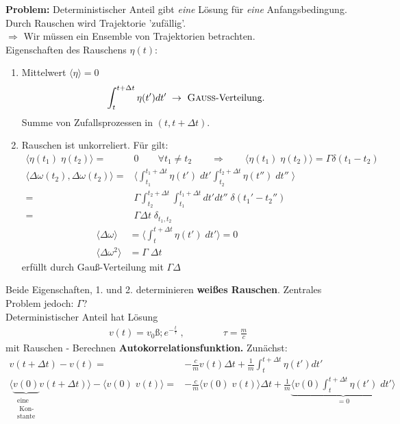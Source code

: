 \documentclass[12pt]{article}
\begin{document}
\textbf{Problem:} Deterministischer Anteil gibt \textit{eine} Lösung für \textit{eine} Anfangsbedingung. Durch Rauschen wird Trajektorie 'zufällig'. \\
$\Rightarrow$ Wir müssen ein Ensemble von Trajektorien betrachten.\\
Eigenschaften des Rauschens $\eta (t)$:
\begin{enumerate}
\item Mittelwert $\langle \eta \rangle = 0 $
\begin{align}
\int_t^{t + \Delta t} \eta (t') dt' \; \to \mbox{ \textsc{Gauss}-Verteilung.}
\end{align}
Summe von Zufallsprozessen in $(t, t+\Delta t)$.
\item Rauschen ist unkorreliert. Für gilt:
\begin{align*}
 \langle \eta(t_1) \; \eta (t_2) \rangle =& 0 \qquad \forall t_1 \neq t_2  \qquad \Rightarrow \qquad
 \langle \eta(t_1) \; \eta (t_2) \rangle = \Gamma \delta (t_1 - t_2)\\
 \langle\Delta \omega(t_2), \Delta \omega(t_2)\rangle
 =& \langle \int_{t_1}^{t_1 + \Delta t} \eta (t')  \; dt'  \int_{t_2}^{t_2 + \Delta t} \eta (t'') \;  dt'' \; \rangle  \\
 =& \Gamma  \int_{t_2}^{t_2 + \Delta t} \int_{t_1}^{t_1 + \Delta t} dt' dt'' \; \delta(t_1'-t_2'') \\
 =& \Gamma \Delta t\;  \delta_{t_1,t_2} 
\end{align*}
\begin{align}
 \langle \Delta \omega \rangle &= \langle \int_t^{t+\Delta t}  \eta (t') \; dt' \rangle =0 \qquad \qquad  \\
 \langle \Delta \omega^2 \rangle &= \Gamma \; \Delta t
\end{align}
erfüllt durch Gauß-Verteilung mit $\Gamma \Delta $
\end{enumerate}
Beide Eigenschaften, 1. und 2. determinieren \textbf{weißes Rauschen}. Zentrales Problem jedoch: $\Gamma $?\\
Deterministischer Anteil hat Lösung
\begin{align}
v(t) = v_0 ß; e^{- \frac{t}{\tau}} \; , \qquad \qquad \tau = \frac{m}{c}
\end{align}
mit Rauschen - Berechnen \textbf{Autokorrelationsfunktion.} Zunächst:
\begin{align*}
v(t+ \Delta t ) - v(t) =& - \frac{c}{m} v(t) \Delta t + \frac{1}{m} \int_t^{t+\Delta t} \eta (t') dt' \\
\langle \underbrace{  v(0)}_{ \substack{\text{eine} \\ \text{ Kon-} \\ \text{stante}}} v(t+ \Delta t ) \rangle - \langle v(0) \; v(t) \rangle =&- \frac{c}{m} \langle v(0)\;  v(t) \rangle \Delta t + \frac{1}{m} \underbrace{ \langle v(0) \int_t^{t+\Delta t} \eta (t') \; dt' \rangle }_\text{$=0$} 
\end{align*}
\end{document}
